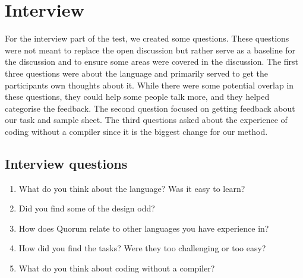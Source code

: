 \section{Interview}
For the interview part of the test, we created some questions.
These questions were not meant to replace the open discussion but rather serve as a baseline for the discussion and to ensure some areas were covered in the discussion.
The first three questions were about the language and primarily served to get the participants own thoughts about it.
While there were some potential overlap in these questions, they could help some people talk more, and they helped categorise the feedback.
The second question focused on getting feedback about our task and sample sheet.
The third questions asked about the experience of coding without a compiler since it is the biggest change for our method.

\subsection{Interview questions}
\begin{enumerate}
\item What do you think about the language? Was it easy to learn?
\item Did you find some of the design odd?
\item How does Quorum relate to other languages you have experience in?
\item How did you find the tasks? Were they too challenging or too easy?
\item What do you think about coding without a compiler?
\end{enumerate}	